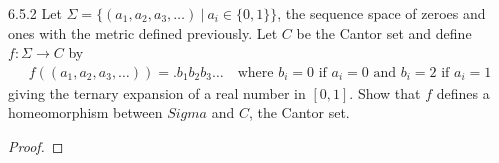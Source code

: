 \begin{problem}{6.5.2}
  Let $\Sigma = \{(a_1, a_2, a_3, \dots) \ |\ a_i \in \{0, 1\}\}$, the sequence
  space of zeroes and ones with the metric defined previously. Let $C$ be the
  Cantor set and define $f: \Sigma \to C$ by
  \begin{align*}
    f((a_1, a_2, a_3, \dots)) = .b_1b_2b_3\dots \quad \text{where $b_i = 0$ if $a_i = 0$ and $b_i = 2$ if $a_i = 1$}
  \end{align*}
  giving the ternary expansion of a real number in $[0, 1]$. Show that $f$ defines
  a homeomorphism between $Sigma$ and $C$, the Cantor set.
\end{problem}


\begin{proof}
\end{proof}
\newpage

